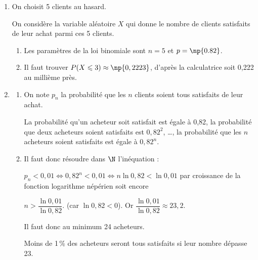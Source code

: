\begin{enumerate}
\item On choisit 5 clients au hasard.

On considère la variable aléatoire $X$ qui donne le
nombre de clients satisfaits de leur achat parmi ces 5 clients.
	\begin{enumerate}
		\item %
Les paramètres de la loi binomiale sont $ n = 5 $ \quad et \quad  $ p=\np{0.82}$.
		\item %
		
Il faut trouver $P(X \leqslant 3) \approx \np{0,2223}$, d'après la calculatrice soit 0,222 au millième près.
	\end{enumerate}
\item %

	\begin{enumerate}
		\item On note $p_n$ la probabilité que les $n$ clients soient tous satisfaits de leur achat.

La probabilité qu'un acheteur soit satisfait est égale à 0,82, la probabilité que deux acheteurs soient satisfaits est $0,82^2$, \ldots, la probabilité que les $n$ acheteurs soient satisfaits est égale à $0,82^n$.
		\item %
		
Il faut donc résoudre dans $\N$ l'inéquation :

$p_n < 0,01 \iff 0,82^n < 0,01 \iff n \ln 0,82 < \ln 0,01$ par croissance de la fonction logarithme népérien soit encore 

$n > \dfrac{\ln 0,01}{\ln 0,82}$. (car $\ln 0,82 < 0$). Or $\dfrac{\ln 0,01}{\ln 0,82} \approx 23,2$.

Il faut donc au minimum 24 acheteurs.

Moins de 1\,\% des acheteurs seront tous satisfaits si leur nombre dépasse 23.
	\end{enumerate}
\end{enumerate}

\bigskip

